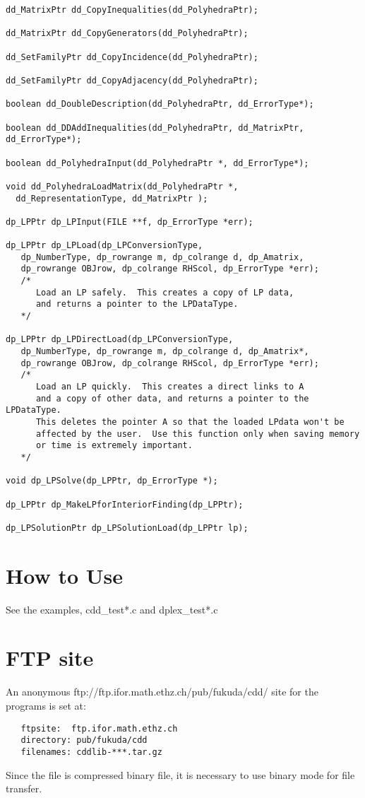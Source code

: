 \documentclass[11pt]{article}
\newcommand {\0} {{\bf 0}}
\begin{document}
\begin{verbatim}
dd_MatrixPtr dd_CopyInequalities(dd_PolyhedraPtr);

dd_MatrixPtr dd_CopyGenerators(dd_PolyhedraPtr);

dd_SetFamilyPtr dd_CopyIncidence(dd_PolyhedraPtr);

dd_SetFamilyPtr dd_CopyAdjacency(dd_PolyhedraPtr);

boolean dd_DoubleDescription(dd_PolyhedraPtr, dd_ErrorType*);

boolean dd_DDAddInequalities(dd_PolyhedraPtr, dd_MatrixPtr, dd_ErrorType*);

boolean dd_PolyhedraInput(dd_PolyhedraPtr *, dd_ErrorType*);

void dd_PolyhedraLoadMatrix(dd_PolyhedraPtr *, 
  dd_RepresentationType, dd_MatrixPtr );

dp_LPPtr dp_LPInput(FILE **f, dp_ErrorType *err);  

dp_LPPtr dp_LPLoad(dp_LPConversionType,
   dp_NumberType, dp_rowrange m, dp_colrange d, dp_Amatrix, 
   dp_rowrange OBJrow, dp_colrange RHScol, dp_ErrorType *err);  
   /* 
      Load an LP safely.  This creates a copy of LP data,
      and returns a pointer to the LPDataType.  
   */

dp_LPPtr dp_LPDirectLoad(dp_LPConversionType,
   dp_NumberType, dp_rowrange m, dp_colrange d, dp_Amatrix*, 
   dp_rowrange OBJrow, dp_colrange RHScol, dp_ErrorType *err);  
   /* 
      Load an LP quickly.  This creates a direct links to A
      and a copy of other data, and returns a pointer to the LPDataType.
      This deletes the pointer A so that the loaded LPdata won't be
      affected by the user.  Use this function only when saving memory
      or time is extremely important.
   */

void dp_LPSolve(dp_LPPtr, dp_ErrorType *);

dp_LPPtr dp_MakeLPforInteriorFinding(dp_LPPtr);  

dp_LPSolutionPtr dp_LPSolutionLoad(dp_LPPtr lp);

\end{verbatim}

\section{How to Use}  \label{HOWTO}

See the examples, cdd\_test*.c and dplex\_test*.c


\section{FTP site}  \label{FTP}
An anonymous 
{ftp://ftp.ifor.math.ethz.ch/pub/fukuda/cdd/} site for the programs is set at:
\begin{verbatim}
   ftpsite:  ftp.ifor.math.ethz.ch
   directory: pub/fukuda/cdd
   filenames: cddlib-***.tar.gz
\end{verbatim}
Since the file is compressed binary file, it is necessary to use binary mode for
file transfer.
\end{document}
